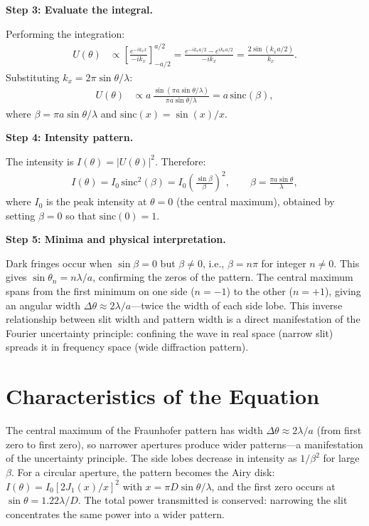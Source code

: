 \documentclass[11pt,openright]{book}
\begin{document}
\textbf{Step 3: Evaluate the integral.}

Performing the integration:
\begin{align}
U(\theta) &\propto \left[\frac{e^{-ik_x x}}{-ik_x}\right]_{-a/2}^{a/2} = \frac{e^{-ik_x a/2} - e^{ik_x a/2}}{-ik_x} = \frac{2\sin(k_x a/2)}{k_x}.
\end{align}
Substituting $k_x = 2\pi\sin\theta/\lambda$:
\begin{align}
U(\theta) &\propto a\,\frac{\sin(\pi a\sin\theta/\lambda)}{\pi a\sin\theta/\lambda} = a\,\text{sinc}(\beta),
\end{align}
where $\beta = \pi a\sin\theta/\lambda$ and $\text{sinc}(x) = \sin(x)/x$.

\textbf{Step 4: Intensity pattern.}

The intensity is $I(\theta) = |U(\theta)|^2$. Therefore:
\begin{align}
I(\theta) = I_0\,\text{sinc}^2(\beta) = I_0\left(\frac{\sin\beta}{\beta}\right)^{\!2}, \qquad \beta = \frac{\pi a\sin\theta}{\lambda},
\end{align}
where $I_0$ is the peak intensity at $\theta = 0$ (the central maximum), obtained by setting $\beta = 0$ so that $\text{sinc}(0) = 1$.

\textbf{Step 5: Minima and physical interpretation.}

Dark fringes occur when $\sin\beta = 0$ but $\beta \neq 0$, i.e., $\beta = n\pi$ for integer $n \neq 0$. This gives $\sin\theta_n = n\lambda/a$, confirming the zeros of the pattern. The central maximum spans from the first minimum on one side ($n = -1$) to the other ($n = +1$), giving an angular width $\Delta\theta \approx 2\lambda/a$---twice the width of each side lobe. This inverse relationship between slit width and pattern width is a direct manifestation of the Fourier uncertainty principle: confining the wave in real space (narrow slit) spreads it in frequency space (wide diffraction pattern).

\section*{Characteristics of the Equation}

The central maximum of the Fraunhofer pattern has width $\Delta\theta \approx 2\lambda/a$ (from first zero to first zero), so narrower apertures produce wider patterns---a manifestation of the uncertainty principle. The side lobes decrease in intensity as $1/\beta^2$ for large $\beta$. For a circular aperture, the pattern becomes the Airy disk: $I(\theta) = I_0\left[2J_1(x)/x\right]^2$ with $x = \pi D \sin\theta/\lambda$, and the first zero occurs at $\sin\theta = 1.22\lambda/D$. The total power transmitted is conserved: narrowing the slit concentrates the same power into a wider pattern.
\end{document}
